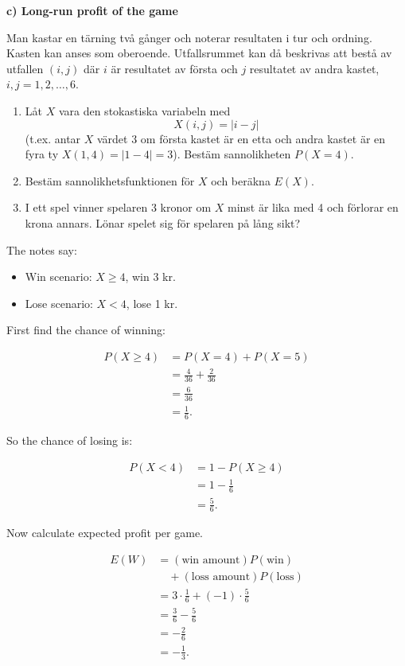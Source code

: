 \documentclass[10pt]{article}
\begin{document}
\textbf{c) Long-run profit of the game}

Man kastar en tärning två gånger och noterar resultaten i tur och ordning.
Kasten kan anses som oberoende. Utfallsrummet kan då beskrivas att bestå av
utfallen \((i,j)\) där \(i\) är resultatet av första och \(j\) resultatet
av andra kastet, \(i,j=1,2,\ldots,6\).

\begin{enumerate}[label=\alph*)]
\item
Låt \(X\) vara den stokastiska variabeln med
\[
X(i,j)=|i-j|
\]
(t.ex. antar \(X\) värdet 3 om första kastet är en etta och andra kastet
är en fyra ty \(X(1,4)=|1-4|=3\)).
Bestäm sannolikheten \(P(X=4)\).

\item
Bestäm sannolikhetsfunktionen för \(X\) och beräkna \(E(X)\).

\item
I ett spel vinner spelaren 3 kronor om \(X\) minst är lika med 4 och
förlorar en krona annars. Lönar spelet sig för spelaren på lång sikt?
\end{enumerate}

The notes say:

\begin{itemize}
\item
Win scenario: \(X\ge 4\), win 3 kr.
\item
Lose scenario: \(X<4\), lose 1 kr.
\end{itemize}

First find the chance of winning:

\begin{align*}
P(X\ge 4)
&=
P(X=4)+P(X=5)\\[2mm]
&=
\frac{4}{36}
+
\frac{2}{36}\\[2mm]
&=
\frac{6}{36}\\[2mm]
&=
\frac{1}{6}.
\end{align*}

So the chance of losing is:

\begin{align*}
P(X<4)
&=
1-P(X\ge 4)\\[2mm]
&=
1-\frac{1}{6}\\[2mm]
&=
\frac{5}{6}.
\end{align*}

Now calculate expected profit per game.

\begin{align*}
E(W)
&=
(\text{win amount})P(\text{win})\\
&\quad+
(\text{loss amount})P(\text{loss})\\[2mm]
&=
3\cdot\frac{1}{6}
+
(-1)\cdot\frac{5}{6}\\[2mm]
&=
\frac{3}{6}
-
\frac{5}{6}\\[2mm]
&=
-\frac{2}{6}\\[2mm]
&=
-\frac{1}{3}.
\end{align*}
\end{document}
